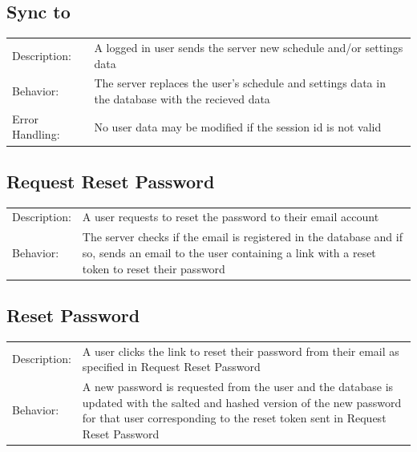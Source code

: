 \documentclass{scrreprt}
\begin{document}
\subsection{Sync to}
\begin{center}
\begin{tabular}{ p{2cm} p{13cm} }
Description: & A logged in user sends the server new schedule and/or settings data\\
Behavior: & The server replaces the user's schedule and settings data in the database with the recieved data\\
Error Handling: & No user data may be modified if the session id is not valid\\
\end{tabular}
\end{center}

\subsection{Request Reset Password}
\begin{center}
\begin{tabular}{ p{2cm} p{13cm} }
Description: & A user requests to reset the password to their email account\\
Behavior: & The server checks if the email is registered in the database and if so, sends an email
to the user containing a link with a reset token to reset their password\\
\end{tabular}
\end{center}

\subsection{Reset Password}
\begin{center}
\begin{tabular}{ p{2cm} p{13cm} }
Description: & A user clicks the link to reset their password from their email as specified in Request Reset Password\\
Behavior: & A new password is requested from the user and the database is updated with the salted and hashed version
of the new password for that user corresponding to the reset token sent in Request Reset Password\\
\end{tabular}
\end{center}
\end{document}
